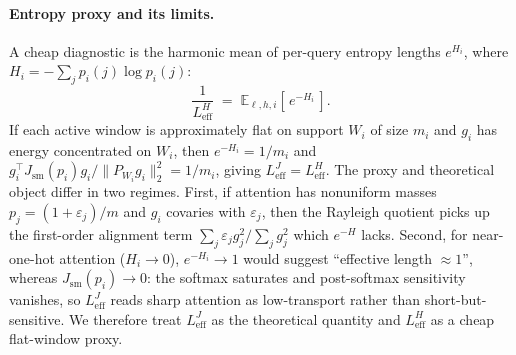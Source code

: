 \paragraph{Entropy proxy and its limits.}
A cheap diagnostic is the harmonic mean of per-query entropy lengths $e^{H_i}$, where $H_i = -\sum_j p_i(j)\log p_i(j)$:
\begin{equation}
\frac{1}{L_{\mathrm{eff}}^{H}} \;=\; \mathbb{E}_{\ell,h,i}\!\left[\,e^{-H_i}\,\right].
\label{eq:leff-H}
\end{equation}
If each active window is approximately flat on support $W_i$ of size $m_i$ and $g_i$ has energy concentrated on $W_i$, then $e^{-H_i}{=}1/m_i$ and $g_i^\top J_{\mathrm{sm}}(p_i) g_i/\|P_{W_i}g_i\|_2^2 = 1/m_i$, giving $L_{\mathrm{eff}}^{J} = L_{\mathrm{eff}}^{H}$. The proxy and theoretical object differ in two regimes. First, if attention has nonuniform masses $p_j = (1{+}\varepsilon_j)/m$ and $g_i$ covaries with $\varepsilon_j$, then the Rayleigh quotient picks up the first-order alignment term $\sum_j \varepsilon_j g_j^2/\sum_j g_j^2$ which $e^{-H}$ lacks. Second, for near-one-hot attention ($H_i{\to}0$), $e^{-H_i}\!\to\!1$ would suggest ``effective length $\approx 1$'', whereas $J_{\mathrm{sm}}(p_i)\to 0$: the softmax saturates and post-softmax sensitivity vanishes, so $L_{\mathrm{eff}}^{J}$ reads sharp attention as low-transport rather than short-but-sensitive. We therefore treat $L_{\mathrm{eff}}^{J}$ as the theoretical quantity and $L_{\mathrm{eff}}^{H}$ as a cheap flat-window proxy.

